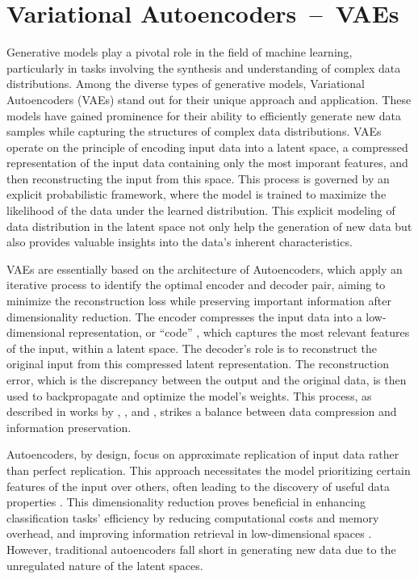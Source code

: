 \section{Variational Autoencoders~--~VAEs}\label{VAEs}

Generative models play a pivotal role in the field of machine learning, particularly in tasks involving the synthesis and understanding of complex data distributions. Among the diverse types of generative models, Variational Autoencoders (VAEs) stand out for their unique approach and application. These models have gained prominence for their ability to efficiently generate new data samples while capturing the structures of complex data distributions. VAEs operate on the principle of encoding input data into a latent space, a compressed representation of the input data containing only the most imporant features, and then reconstructing the input from this space. This process is governed by an explicit probabilistic framework, where the model is trained to maximize the likelihood of the data under the learned distribution. This explicit modeling of data distribution in the latent space not only help the generation of new data but also provides valuable insights into the data's inherent characteristics. 

VAEs are essentially based on the architecture of Autoencoders, which apply an iterative process to identify the optimal encoder and decoder pair, aiming to minimize the reconstruction loss while preserving important information after dimensionality reduction. The encoder compresses the input data into a low-dimensional representation, or ``code'' \citep{hintonCode, GoodfellowDeepLearning}, which captures the most relevant features of the input, within a latent space. The decoder's role is to reconstruct the original input from this compressed latent representation. The reconstruction error, which is the discrepancy between the output and the original data, is then used to backpropagate and optimize the model's weights. This process, as described in works by \citeauthor{hintonCode}, \citeauthor{GoodfellowDeepLearning}, and \citeauthor{michelucci2022introduction}, strikes a balance between data compression and information preservation.

Autoencoders, by design, focus on approximate replication of input data rather than perfect replication. This approach necessitates the model prioritizing certain features of the input over others, often leading to the discovery of useful data properties \citep{GoodfellowDeepLearning}. This dimensionality reduction proves beneficial in enhancing classification tasks' efficiency by reducing computational costs and memory overhead, and improving information retrieval in low-dimensional spaces \citep{GoodfellowDeepLearning}. However, traditional autoencoders fall short in generating new data due to the unregulated nature of the latent spaces.

